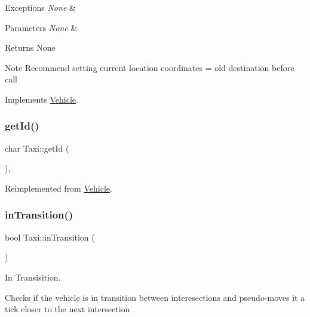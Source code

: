\begin{DoxyExceptions}{Exceptions}
{\em None} & \\
\hline
\end{DoxyExceptions}

\begin{DoxyParams}{Parameters}
{\em None} & \\
\hline
\end{DoxyParams}
\begin{DoxyReturn}{Returns}
None
\end{DoxyReturn}
\begin{DoxyNote}{Note}
Recommend setting current location coordinates = old destination before call 
\end{DoxyNote}


Implements \hyperlink{class_vehicle_a90c2c61dde3e87728bca29b4ebe40a95}{Vehicle}.

\hypertarget{class_taxi_a627cf1c475dd2bfafca59fceae551d09}{}\label{class_taxi_a627cf1c475dd2bfafca59fceae551d09} 
\subsubsection{\texorpdfstring{get\+Id()}{getId()}}
{\footnotesize\ttfamily char Taxi\+::get\+Id (\begin{DoxyParamCaption}{ }\end{DoxyParamCaption})\hspace{0.3cm}{\ttfamily [inline]}, {\ttfamily [virtual]}}



Reimplemented from \hyperlink{class_vehicle_a2233c46c45ad1efd5a1e190716592f16}{Vehicle}.

\hypertarget{class_taxi_aa4439261ca296dcb30339078bb344931}{}\label{class_taxi_aa4439261ca296dcb30339078bb344931} 
\subsubsection{\texorpdfstring{in\+Transition()}{inTransition()}}
{\footnotesize\ttfamily bool Taxi\+::in\+Transition (\begin{DoxyParamCaption}{ }\end{DoxyParamCaption})}



In Transisition. 

Checks if the vehicle is in transition between interesections and pseudo-\/moves it a tick closer to the next intersection

